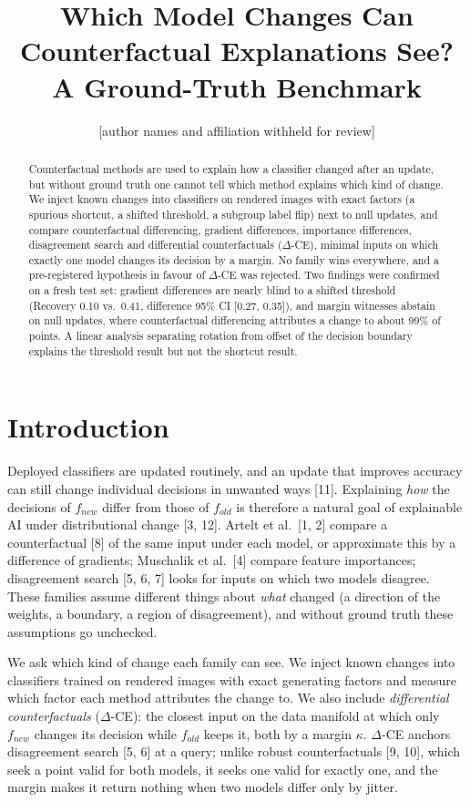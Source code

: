 \documentclass{esannV2}
\title{Which Model Changes Can Counterfactual Explanations See?\\A Ground-Truth Benchmark}
\author{[author names and affiliation withheld for review]}
\begin{document}
\maketitle

\begin{abstract}
Counterfactual methods are used to explain how a classifier changed after an update, but without ground truth one cannot tell which method explains which kind of change. We inject known changes into classifiers on rendered images with exact factors (a spurious shortcut, a shifted threshold, a subgroup label flip) next to null updates, and compare counterfactual differencing, gradient differences, importance differences, disagreement search and differential counterfactuals ($\Delta$-CE), minimal inputs on which exactly one model changes its decision by a margin. No family wins everywhere, and a pre-registered hypothesis in favour of $\Delta$-CE was rejected. Two findings were confirmed on a fresh test set: gradient differences are nearly blind to a shifted threshold (Recovery 0.10 vs.\ 0.41, difference 95\% CI [0.27, 0.35]), and margin witnesses abstain on null updates, where counterfactual differencing attributes a change to about 99\% of points. A linear analysis separating rotation from offset of the decision boundary explains the threshold result but not the shortcut result.
\end{abstract}

\section{Introduction}

Deployed classifiers are updated routinely, and an update that improves accuracy can still change individual decisions in unwanted ways [11]. Explaining \emph{how} the decisions of $f_{new}$ differ from those of $f_{old}$ is therefore a natural goal of explainable AI under distributional change [3, 12]. Artelt et al.\ [1, 2] compare a counterfactual [8] of the same input under each model, or approximate this by a difference of gradients; Muschalik et al.\ [4] compare feature importances; disagreement search [5, 6, 7] looks for inputs on which two models disagree. These families assume different things about \emph{what} changed (a direction of the weights, a boundary, a region of disagreement), and without ground truth these assumptions go unchecked.

We ask which kind of change each family can see. We inject known changes into classifiers trained on rendered images with exact generating factors and measure which factor each method attributes the change to. We also include \emph{differential counterfactuals} ($\Delta$-CE): the closest input on the data manifold at which only $f_{new}$ changes its decision while $f_{old}$ keeps it, both by a margin $\kappa$. $\Delta$-CE anchors disagreement search [5, 6] at a query; unlike robust counterfactuals [9, 10], which seek a point valid for both models, it seeks one valid for exactly one, and the margin makes it return nothing when two models differ only by jitter.
\end{document}
